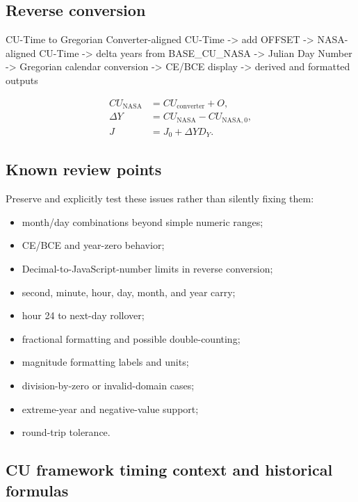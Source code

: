 \documentclass[11pt,letterpaper]{article}
\begin{document}
\subsection{Reverse conversion}

\begin{codebox}{CU-Time to Gregorian}
Converter-aligned CU-Time
  -> add OFFSET
  -> NASA-aligned CU-Time
  -> delta years from BASE_CU_NASA
  -> Julian Day Number
  -> Gregorian calendar conversion
  -> CE/BCE display
  -> derived and formatted outputs
\end{codebox}

\begin{align*}
CU_{\mathrm{NASA}} &= CU_{\mathrm{converter}} + O, \\
\Delta Y &= CU_{\mathrm{NASA}} - CU_{\mathrm{NASA},0}, \\
J &= J_0 + \Delta Y D_Y.
\end{align*}

\subsection{Known review points}

Preserve and explicitly test these issues rather than silently fixing them:

\begin{itemize}
    \item month/day combinations beyond simple numeric ranges;
    \item CE/BCE and year-zero behavior;
    \item Decimal-to-JavaScript-number limits in reverse conversion;
    \item second, minute, hour, day, month, and year carry;
    \item hour 24 to next-day rollover;
    \item fractional formatting and possible double-counting;
    \item magnitude formatting labels and units;
    \item division-by-zero or invalid-domain cases;
    \item extreme-year and negative-value support;
    \item round-trip tolerance.
\end{itemize}

\subsection{CU framework timing context and historical formulas}
\end{document}
